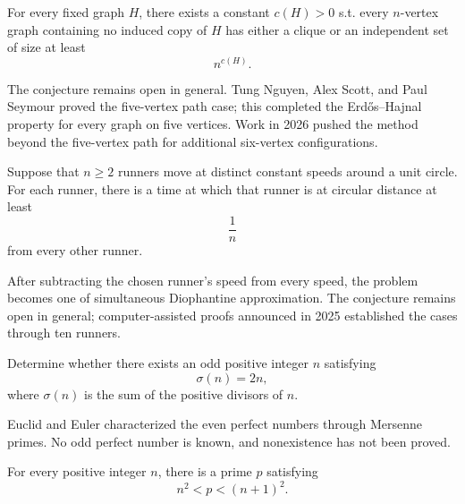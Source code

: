     \begin{conjecture}
        For every fixed graph $H$, there exists a constant $c(H)>0$ s.t. every
        $n$-vertex graph containing no induced copy of $H$ has either a clique or
        an independent set of size at least
        \[
            n^{c(H)}.
        \]
    \end{conjecture}

    \begin{remark}
        The conjecture remains open in general. Tung Nguyen, Alex Scott, and
        Paul Seymour proved the five-vertex path case; this completed the
        Erd\H{o}s--Hajnal property for every graph on five vertices. Work in 2026
        pushed the method beyond the five-vertex path for additional six-vertex
        configurations.
    \end{remark}

    \begin{conjecture}
        Suppose that $n\geq 2$ runners move at distinct constant speeds around a
        unit circle. For each runner, there is a time at which that runner is at
        circular distance at least
        \[
            \frac{1}{n}
        \]
        from every other runner.
    \end{conjecture}

    \begin{remark}
        After subtracting the chosen runner's speed from every speed, the
        problem becomes one of simultaneous Diophantine approximation. The
        conjecture remains open in general; computer-assisted proofs announced
        in 2025 established the cases through ten runners.
    \end{remark}

    \begin{openproblem}
        Determine whether there exists an odd positive integer $n$ satisfying
        \[
            \sigma(n)=2n,
        \]
        where $\sigma(n)$ is the sum of the positive divisors of $n$.
    \end{openproblem}

    \begin{remark}
        Euclid and Euler characterized the even perfect numbers through Mersenne
        primes. No odd perfect number is known, and nonexistence has not been
        proved.
    \end{remark}

    \begin{conjecture}
        For every positive integer $n$, there is a prime $p$ satisfying
        \[
            n^2<p<(n+1)^2.
        \]
    \end{conjecture}


